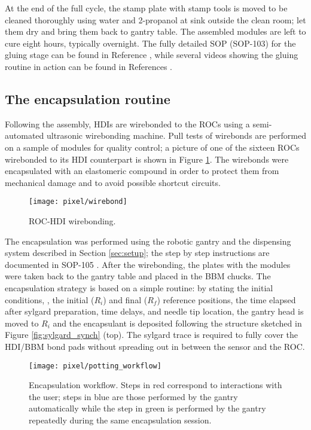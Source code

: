 At the end of the full cycle, the stamp plate with stamp tools is moved to be cleaned thoroughly using water and 2-propanol at sink outside the clean room; let them dry and bring them back to gantry table. The assembled modules are left to cure eight hours, typically overnight. The fully detailed SOP (SOP-103) for the gluing stage can be found in Reference \cite{sop_103}, while several videos showing the gluing routine in action can be found in References \cite{gluing_frank, jmonroy_channel}. 

\subsection{The encapsulation routine}

Following the assembly, HDIs are wirebonded to the ROCs using a semi-automated ultrasonic wirebonding machine. Pull tests of wirebonds are performed on a sample of modules for quality control; a picture of one of the sixteen ROCs wirebonded to its HDI counterpart is shown in Figure \ref{fig:wirebonds}. The wirebonds were encapsulated with an elastomeric compound in order to protect them from mechanical damage and to avoid possible shortcut circuits.

\begin{figure}[h]
\begin{center}
  \texttt{[image: pixel/wirebond]}
 \caption[ROC-HDI wirebonding.]{ROC-HDI wirebonding.}\label{fig:wirebonds}
\end{center}
\end{figure}

The encapsulation was performed using the robotic gantry and the dispensing system described in Section \ref{sec:setup}; the step by step instructions are documented in SOP-105 \cite{sop_105}. After the wirebonding, the plates with the modules were taken back to the gantry table and placed in the BBM chucks. The encapsulation strategy is based on a simple routine: by stating the initial conditions, \ie, the initial ($R_i$) and final ($R_f$) reference positions, the time elapsed after sylgard preparation, time delays, and needle tip location, the gantry head is moved to $R_i$ and the encapsulant is deposited following the structure sketched in Figure \ref{fig:sylgard_synch} (top). The sylgard trace is required to fully cover the HDI/BBM bond pads without spreading out in between the sensor and the ROC.

\begin{figure}[h]
\begin{center}
  \texttt{[image: pixel/potting\_workflow]}
  \caption[Encapsulation workflow.]{Encapsulation workflow. Steps in red correspond to interactions with the user; steps in blue are those performed by the gantry automatically while the step in green is performed by the gantry repeatedly during the same encapsulation session.}\label{fig:potting_workflow}
\end{center}
\end{figure}

